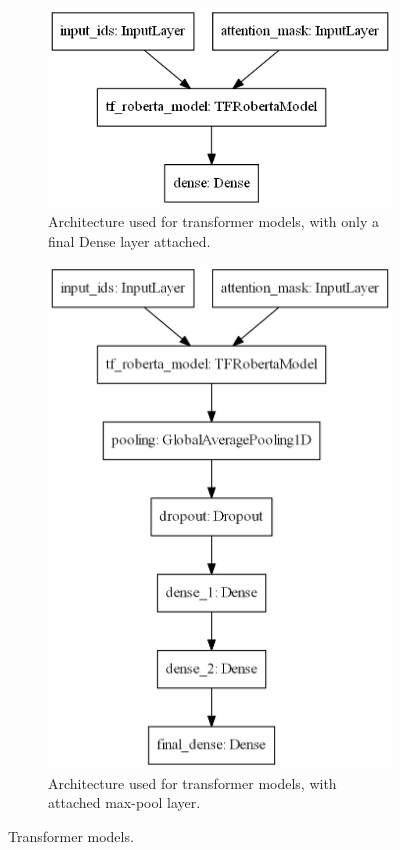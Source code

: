 \documentclass[acmsmall,nonacm]{acmart}
\begin{document}
\begin{figure}[H]
  \begin{subfigure}[b]{0.35\textwidth}
    \includegraphics[width=\textwidth]{assets/roberta_model.png}
    \caption{Architecture used for transformer models, with only a final Dense layer attached.}
    \label{fig:roberta_model}
  \end{subfigure}
  \hfill
  \begin{subfigure}[b]{0.35\textwidth}
    \includegraphics[width=\textwidth]{assets/roberta_model_maxpool.png}
    \caption{Architecture used for transformer models, with attached max-pool layer.}
    \label{fig:roberta_maxpool_model}
  \end{subfigure}
  \caption{Transformer models.}
  \label{fig:transformer_models}
\end{figure}
\end{document}

